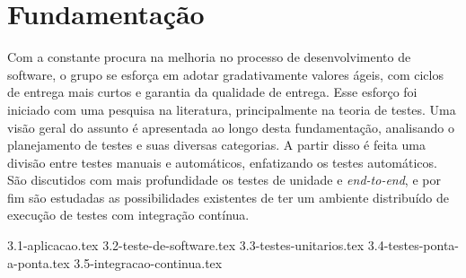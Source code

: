 \chapter{Fundamentação}\label{cap_fundamentacao}

Com a constante procura na melhoria no processo de desenvolvimento de software, o grupo se esforça em adotar gradativamente valores ágeis, com ciclos de entrega mais curtos e garantia da qualidade de entrega. Esse esforço foi iniciado com uma pesquisa na literatura, principalmente na teoria de testes.
Uma visão geral do assunto é apresentada ao longo desta fundamentação, analisando o planejamento de testes e suas diversas categorias. A partir disso é feita uma divisão entre testes manuais e automáticos, enfatizando os testes automáticos. São discutidos com mais profundidade os testes de unidade e \emph{end-to-end}, e por fim são estudadas as possibilidades existentes de ter um ambiente distribuído de execução de testes com integração contínua.

{3.1-aplicacao.tex}
{3.2-teste-de-software.tex}
{3.3-testes-unitarios.tex}
{3.4-testes-ponta-a-ponta.tex}
{3.5-integracao-continua.tex}